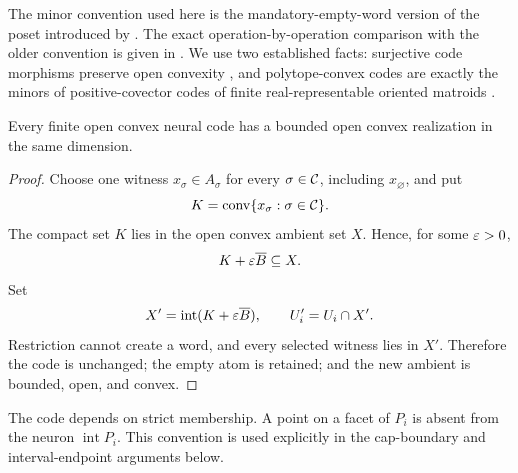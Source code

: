 The minor convention used here is the mandatory-empty-word version of the poset introduced by \citet{Jeffs2020}.  The exact operation-by-operation comparison with the older convention is given in .  We use two established facts: surjective code morphisms preserve open convexity \cite{Jeffs2020}, and polytope-convex codes are exactly the minors of positive-covector codes of finite real-representable oriented matroids \cite{KuninLienkaemperRosen2023}.

\begin{lemma}
\label{lem:bounded-realization}
Every finite open convex neural code has a bounded open convex realization in the same dimension.
\end{lemma}

\begin{proof}
Choose one witness $x_\sigma\in A_\sigma$ for every $\sigma\in\mathcal C$, including $x_\varnothing$, and put
\[
 K=\operatorname{conv}\{x_\sigma:\sigma\in\mathcal C\}.
\]
The compact set $K$ lies in the open convex ambient set $X$.  Hence, for some $\varepsilon>0$,
\[
 K+\varepsilon\overline B\subseteq X.
\]
Set
\[
 X'=\operatorname{int}(K+\varepsilon\overline B),
 \qquad U_i'=U_i\cap X'.
\]
Restriction cannot create a word, and every selected witness lies in $X'$.  Therefore the code is unchanged; the empty atom is retained; and the new ambient is bounded, open, and convex.
\end{proof}

\begin{remark}
The code depends on strict membership.  A point on a facet of $P_i$ is absent from the neuron $\operatorname{int}P_i$.  This convention is used explicitly in the cap-boundary and interval-endpoint arguments below.
\end{remark}
